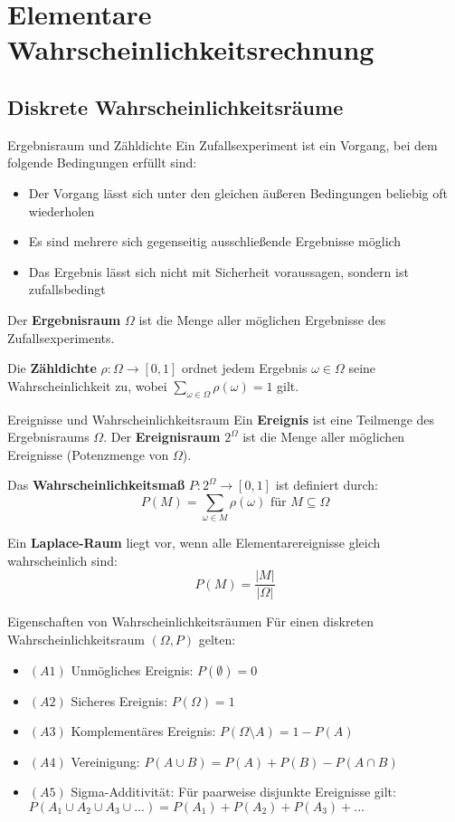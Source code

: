 \section{Elementare Wahrscheinlichkeitsrechnung}

\subsection{Diskrete Wahrscheinlichkeitsräume}

\begin{definition}{Ergebnisraum und Zähldichte}
Ein Zufallsexperiment ist ein Vorgang, bei dem folgende Bedingungen erfüllt sind:
\begin{itemize}
    \item Der Vorgang lässt sich unter den gleichen äußeren Bedingungen beliebig oft wiederholen
    \item Es sind mehrere sich gegenseitig ausschließende Ergebnisse möglich
    \item Das Ergebnis lässt sich nicht mit Sicherheit voraussagen, sondern ist zufallsbedingt
\end{itemize}

Der \textbf{Ergebnisraum} $\Omega$ ist die Menge aller möglichen Ergebnisse des Zufallsexperiments. 

Die \textbf{Zähldichte} $\rho: \Omega \rightarrow[0,1]$ ordnet jedem Ergebnis $\omega \in \Omega$ seine Wahrscheinlichkeit zu, wobei $\sum_{\omega \in \Omega} \rho(\omega) = 1$ gilt.
\end{definition}

\begin{definition}{Ereignisse und Wahrscheinlichkeitsraum}
Ein \textbf{Ereignis} ist eine Teilmenge des Ergebnisraums $\Omega$. Der \textbf{Ereignisraum} $2^\Omega$ ist die Menge aller möglichen Ereignisse (Potenzmenge von $\Omega$).

Das \textbf{Wahrscheinlichkeitsmaß} $P: 2^\Omega \rightarrow [0,1]$ ist definiert durch:
$$P(M) = \sum_{\omega \in M} \rho(\omega) \text{ für } M \subseteq \Omega$$

Ein \textbf{Laplace-Raum} liegt vor, wenn alle Elementarereignisse gleich wahrscheinlich sind:
$$P(M)=\frac{|M|}{|\Omega|}$$
\end{definition}

\begin{theorem}{Eigenschaften von Wahrscheinlichkeitsräumen}
Für einen diskreten Wahrscheinlichkeitsraum $(\Omega,P)$ gelten:
\begin{itemize}
    \item $(A1)$ Unmögliches Ereignis: $P(\emptyset) = 0$
    \item $(A2)$ Sicheres Ereignis: $P(\Omega) = 1$
    \item $(A3)$ Komplementäres Ereignis: $P(\Omega \setminus A) = 1 - P(A)$
    \item $(A4)$ Vereinigung: $P(A \cup B) = P(A) + P(B) - P(A \cap B)$
    \item $(A5)$ Sigma-Additivität: Für paarweise disjunkte Ereignisse gilt:\\
    $P(A_1 \cup A_2 \cup A_3 \cup ...) = P(A_1) + P(A_2) + P(A_3) + ...$
\end{itemize}
\end{theorem}


